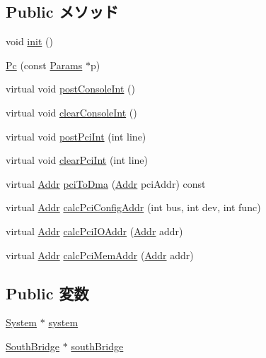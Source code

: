 \subsection*{Public メソッド}
\begin{DoxyCompactItemize}
\item 
void \hyperlink{classPc_a02fd73d861ef2e4aabb38c0c9ff82947}{init} ()
\item 
\hyperlink{classPc_a6186230aeb24af2fdcdb2d7881df7403}{Pc} (const \hyperlink{classPc_a3cb59bd5a1945e535ba84d5e34ad19ec}{Params} $\ast$p)
\item 
virtual void \hyperlink{classPc_a5b278cebc0a62bc2195edf27f059ab1a}{postConsoleInt} ()
\item 
virtual void \hyperlink{classPc_ad38e46034c079c8e765d3ac7eb99337d}{clearConsoleInt} ()
\item 
virtual void \hyperlink{classPc_a545d1445357706d7259aa73104f44222}{postPciInt} (int line)
\item 
virtual void \hyperlink{classPc_a0d98ea2b236bb883fa15d63a59a2ec9e}{clearPciInt} (int line)
\item 
virtual \hyperlink{base_2types_8hh_af1bb03d6a4ee096394a6749f0a169232}{Addr} \hyperlink{classPc_a87078b3d3a28ae134f6736337e90dac3}{pciToDma} (\hyperlink{base_2types_8hh_af1bb03d6a4ee096394a6749f0a169232}{Addr} pciAddr) const 
\item 
virtual \hyperlink{base_2types_8hh_af1bb03d6a4ee096394a6749f0a169232}{Addr} \hyperlink{classPc_a5b8797a83289cb5fd895c9a5dc7eae6f}{calcPciConfigAddr} (int bus, int dev, int func)
\item 
virtual \hyperlink{base_2types_8hh_af1bb03d6a4ee096394a6749f0a169232}{Addr} \hyperlink{classPc_a83afd16479598cfaeb035fd30eeedd8b}{calcPciIOAddr} (\hyperlink{base_2types_8hh_af1bb03d6a4ee096394a6749f0a169232}{Addr} addr)
\item 
virtual \hyperlink{base_2types_8hh_af1bb03d6a4ee096394a6749f0a169232}{Addr} \hyperlink{classPc_aa2acd9bf04ba56b380e7812ce29971b5}{calcPciMemAddr} (\hyperlink{base_2types_8hh_af1bb03d6a4ee096394a6749f0a169232}{Addr} addr)
\end{DoxyCompactItemize}
\subsection*{Public 変数}
\begin{DoxyCompactItemize}
\item 
\hyperlink{classSystem}{System} $\ast$ \hyperlink{classPc_af27ccd765f13a4b7bd119dc7579e2746}{system}
\item 
\hyperlink{classSouthBridge}{SouthBridge} $\ast$ \hyperlink{classPc_adeda641729958e9bfeb6f15676275af0}{southBridge}
\end{DoxyCompactItemize}


